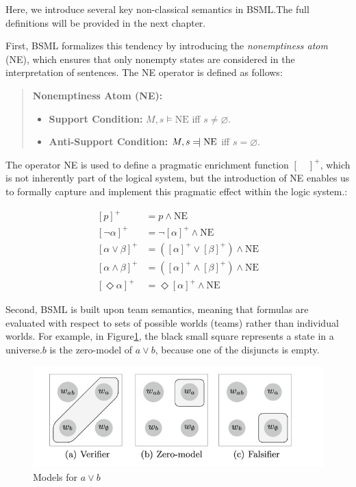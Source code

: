 Here, we introduce several key non-classical semantics in BSML.\@ The full definitions will be provided in the next chapter.\@


First, BSML formalizes this tendency by introducing the \textit{nonemptiness atom} (NE), which ensures that only nonempty states are considered in the interpretation of sentences. 
The NE operator is defined as follows:  

\begin{quote}
    \textbf{Nonemptiness Atom (NE):} 
    \begin{itemize}
        \item \textbf{Support Condition:} $M, s \models \text{NE}$ iff $s \neq \varnothing$.
        \item \textbf{Anti-Support Condition:} $M, s \leftmodels \text{NE}$ iff $s = \varnothing$.
    \end{itemize}
\end{quote}


    The operator NE is used to define a pragmatic enrichment function \({[ \quad]}^+\), which is not inherently part of the logical system, 
    but the introduction of NE enables us to formally capture and implement this pragmatic effect within the logic system.:


\begin{align*}
    {[p]}^+ &= p \land \text{NE} \\
    {[\neg \alpha]}^+ &= \neg {[\alpha]}^+ \land \text{NE} \\
    {[\alpha \lor \beta]}^+ &= ({[\alpha]}^+ \lor {[\beta]}^+) \land \text{NE} \\
    {[\alpha \land \beta]}^+ &= ({[\alpha]}^+ \land {[\beta]}^+) \land \text{NE} \\
    {[\Diamond \alpha]}^+ &= \Diamond {[\alpha]}^+ \land \text{NE}
\end{align*}

Second, BSML is built upon team semantics, meaning that formulas are evaluated with respect to sets of possible worlds (teams) rather than individual worlds. 
For example, in Figure\ref{disjunct}, the black small square represents a state in a universe.\(b\) is the zero-model of \( a \vee b \), because one of the disjuncts is empty.

\begin{figure}[h]
    \centering
    \includegraphics[width=\textwidth]{image/disj1.png}
    \caption{Models for \( a \vee b \)}\label{disjunct}
\end{figure}

